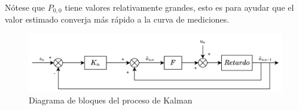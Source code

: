 Nótese que $P_{0,0}$ tiene valores relativamente grandes, esto es para ayudar que el valor estimado converja más rápido a la curva de mediciones.
\begin{figure}
	\centering
	\includegraphics[scale=0.07]{images/kalman_block_diagram.png}
	\caption{Diagrama de bloques del proceso de Kalman}
	\label{fig:kalman_block_diagram}
\end{figure}